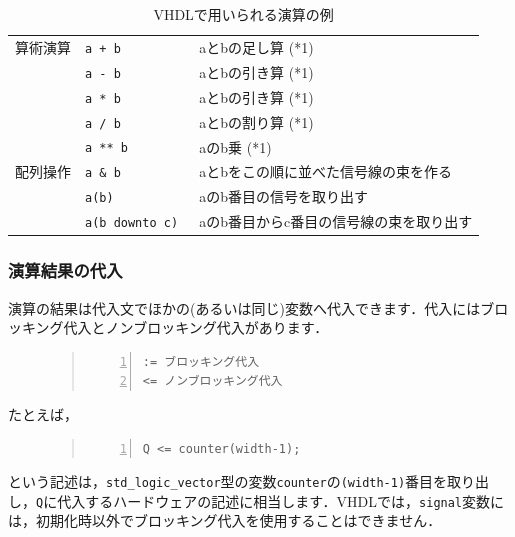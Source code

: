 \documentclass[a4paper,dvipdfmx]{jsarticle}
\begin{document}
\begin{table}[H]
\begin{center}
\begin{tabular}{l|l|l}
  算術演算  & \verb|a + b|   & aとbの足し算 (*1)\\\cline{2-3}
            & \verb|a - b|   & aとbの引き算 (*1)\\\cline{2-3}
            & \verb|a * b|   & aとbの引き算 (*1)\\\cline{2-3}
            & \verb|a / b|   & aとbの割り算 (*1)\\\cline{2-3}
            & \verb|a ** b|  & aのb乗 (*1)\\\hline
   配列操作 & \verb|a & b|   & aとbをこの順に並べた信号線の束を作る \\\cline{2-3}
            & \verb|a(b) |   & aのb番目の信号を取り出す \\\cline{2-3}
            & \verb|a(b downto c) | & aのb番目からc番目の信号線の束を取り出す \\\hline
 \end{tabular}
\end{center}
\caption{VHDLで用いられる演算の例\label{tbl:vhdl_operator}}
\end{table}

\subsubsection{演算結果の代入}
演算の結果は代入文でほかの(あるいは同じ)変数へ代入できます．代入にはブロッキング代入とノンブロッキング代入があります．
\begin{figure}[H]
\begin{quote}
\begin{Verbatim}[frame=single, numbers=left, baselinestretch=0.8]
:= ブロッキング代入
<= ノンブロッキング代入
\end{Verbatim}
\end{quote}
\end{figure}
たとえば，
\begin{figure}[H]
\begin{quote}
\begin{Verbatim}[frame=single, numbers=left, baselinestretch=0.8]
Q <= counter(width-1);
\end{Verbatim}
\end{quote}
\end{figure}
という記述は，\verb|std_logic_vector|型の変数\verb|counter|の\verb|(width-1)|番目を取り出し，\verb|Q|に代入するハードウェアの記述に相当します．VHDLでは，\verb|signal|変数には，初期化時以外でブロッキング代入を使用することはできません．
\end{document}
